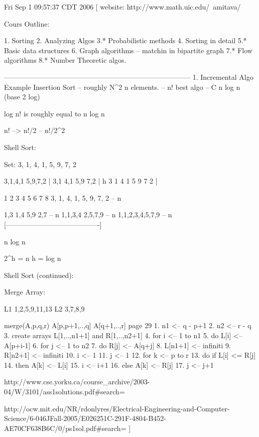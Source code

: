\documentclass[a4paper]{article}
\begin{document}
Fri Sep  1 09:57:37 CDT 2006
[
 website:  http://www.math.uic.edu/~amitava/

 Cours Outline:

 1. Sorting
 2. Analyzing Algos
 3.* Probabilistic methods
 4.  Sorting in detail
 5.* Basic data structures
 6. Graph algorithms  -- matchin in bipartite graph
 7.* Flow algorithms
 8.* Number Theoretic algos.


--------------------------------------------------------------------------------
 1. Incremental Algo
 	Example Insertion Sort  -- roughly N^2
		n elements.  -- n!
	best algo -- C n log n (base 2 log)
	
	log n! is roughly equal to n log n

	n!  --> n!/2 -- n!/2^2

Shell Sort:
  {
 Set:  3, 1, 4, 1, 5, 9, 7, 2 
 
  3,1,4,1                5,9,7,2			|
  3,1     4,1              5,9         7,2		|  h
  3    1   4  1         5    9      7     2		|


 1  2  3  4  5  6  7  8
 3, 1, 4, 1, 5, 9, 7, 2     -- n

 1,3   1,4    5,9   2,7     -- n
 1,1,3,4       2,5,7,9      -- n
      1,1,2,3,4,5,7,9  	    -- n
[----------------------------------------]

	n log n

  2^h = n
  h = log n



  }	


Shell Sort (continued):
 {
   Merge Array:

 L1    1,2,5,9,11,13
 L2    3,7,8,9


 merge(A,p,q,r) A[p,p+1,..,q] A[q+1,..,r]   page 29
 1.  n1 <-- q - p+1
 2.  n2 <-- r - q
 3.  create arrays L[1,..,n1+1] and R[1,..,n2+1]
 4.  for i <-- 1 to n1
 5.     do L[i] <-- A[p+i-1]
 6.  for j <-- 1 to n2
 7.	do R[j] <-- A[q+j]
 8.  L[n1+1] <-- infiniti
 9.  R[n2+1] <-- infiniti
 10. i <-- 1
 11. j <-- 1
 12. for k  <-- p to r
 13. do if L[i] <= R[j]
 14. 	then A[k] <-- L[i]
 15. 		i <-- i+1
 16. 	else A[k] <-- R[j]
 17.		j <-- j+1


 }

http://www.cse.yorku.ca/course_archive/2003-04/W/3101/ass1solutions.pdf#search=%


http://ocw.mit.edu/NR/rdonlyres/Electrical-Engineering-and-Computer-Science/6-046JFall-2005/E026251C-291F-4804-B452-AE70CF638B6C/0/ps1sol.pdf#search=%
]
\end{document}
